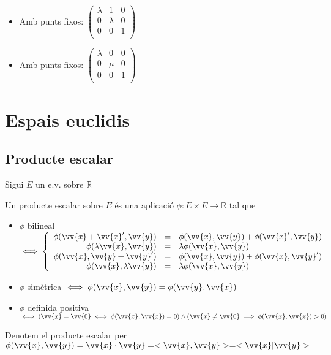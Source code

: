 \begin{itemize}
\begin{itemize}
		\item Amb punts fixos: $\left(\begin{array}{cc|c}\lambda&1&0\\0&\lambda &0\\\hline0&0&1\\\end{array}\right)$
		\item Amb punts fixos: $\left(\begin{array}{cc|c}\lambda&0&0\\0&\mu &0\\\hline0&0&1\\\end{array}\right)$
	\end{itemize}
\end{itemize}

\section{Espais euclidis}

\subsection{Producte escalar}

Sigui $E$ un e.v. sobre $\mathbb{R}$

\begin{defn}
	Un producte escalar sobre $E$ és una aplicació $\phi:E\times E\to\mathbb{R}$ tal que
	\begin{itemize}
		\item $\phi$ bilineal $\iff\left\{\begin{array}{rcl}\phi(\vv{x}+\vv{x}',\vv{y})&=&\phi(\vv{x},\vv{y})+\phi(\vv{x}',\vv{y})\\\phi(\lambda \vv{x},\vv{y})&=&\lambda\phi(\vv{x},\vv{y})\\\phi(\vv{x},\vv{y}+\vv{y}')&=&\phi(\vv{x},\vv{y})+\phi(\vv{x},\vv{y}')\\\phi(\vv{x},\lambda \vv{y})&=&\lambda\phi(\vv{x},\vv{y})\\\end{array}\right.$
		\item $\phi$ simètrica $\iff\phi(\vv{x},\vv{y})=\phi(\vv{y},\vv{x})$
		\item $\phi$ definida positiva $\iff(\vv{x}=\vv{0}\iff\phi(\vv{x},\vv{x})=0)\land(\vv{x}\neq \vv{0}\implies\phi(\vv{x},\vv{x})>0)$
	\end{itemize}
	Denotem el producte escalar per $\phi(\vv{x},\vv{y})=\vv{x}\cdot\vv{y}=<\vv{x},\vv{y}>=<\vv{x}|\vv{y}>$
\end{defn}


